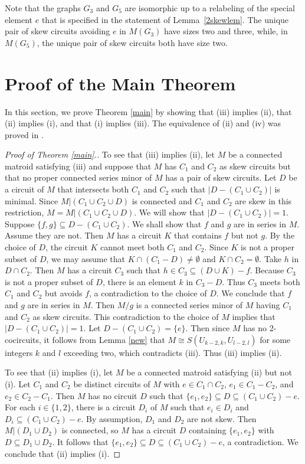 \documentclass[12pt,reqno]{amsart}
\theoremstyle{definition}
\theoremstyle{remark}
\numberwithin{equation}{section}
\begin{document}
Note that the graphs $G_3$ and $G_5$ are isomorphic up to a relabeling of the special element $e$ that is specified in the statement of Lemma~\ref{2skewlem}. The unique pair of skew circuits avoiding $e$ in $M(G_3)$ have sizes two and three, while, in $M(G_5)$, the unique pair of skew circuits both have size two. 

\section{Proof of the Main Theorem}
In this section, we prove Theorem \ref{main} by showing that (iii) implies (ii), that (ii) implies (i), and that (i) implies (iii).    
The equivalence of (ii) and (iv) was proved in \cite[Theorem 1.1]{ub}.

\begin{proof}[Proof of Theorem \ref{main}.]

To see that (iii) implies (ii), let $M$ be a connected matroid satisfying (iii) and suppose that $M$ has $C_1$ and $C_2$ as skew circuits but that no proper connected series minor of $M$ has a pair of skew circuits.  
Let $D$ be a circuit of $M$ that intersects both $C_1$ and $C_2$ such that $|D-(C_1\cup C_2)|$ is minimal. 
Since $M|(C_1\cup C_2\cup D)$ is connected and $C_1$ and $C_2$ are skew in this restriction, $M=M|(C_1\cup C_2\cup D)$.  
We will show that $|D-(C_1\cup C_2)|=1$. 
Suppose $\{f,g\}\subseteq D-(C_1\cup C_2)$. 
We shall show that $f$ and $g$ are in series in $M$. 
Assume they are not. 
Then $M$ has a circuit $K$ that contains $f$ but not $g$. By the choice of $D$, the circuit $K$ cannot meet both $C_1$ and $C_2$. 
Since $K$ is not a proper subset of $D$, we may assume that $K\cap (C_1-D)\neq \emptyset$ and $K\cap C_2=\emptyset$. 
Take $h$ in $D\cap C_2$.
Then $M$ has a circuit $C_3$ such that $h\in C_3\subseteq (D\cup K)-f$. 
Because $C_3$ is not a proper subset of $D$, there is an element $k$ in $C_3-D$. 
Thus $C_3$ meets both $C_1$ and $C_2$ but avoids $f$, a contradiction to the choice of $D$. 
We conclude that $f$ and $g$ are in series in $M$. 
Then $M/g$ is a connected series minor of $M$ having $C_1$ and $C_2$ as skew circuits. 
This contradiction to the choice of $M$ implies that $|D-(C_1\cup C_2)|=1$. 
Let $D-(C_1\cup C_2)=\{e\}$. 
Then since $M$ has no 2-cocircuits, it follows from Lemma \ref{new} that $M\cong S(U_{k-2,k},U_{l-2,l})$ for some integers $k$ and $l$ exceeding two, which contradicts (iii). 
Thus (iii) implies (ii). 

\qquad

To see that (ii) implies (i), let $M$ be a connected matroid satisfying (ii) but not (i). 
Let $C_1$ and $C_2$ be distinct circuits of $M$ with $e\in C_1\cap C_2$, $e_1 \in C_1-C_2$, and $e_2\in C_2-C_1$. 
Then $M$ has no circuit $D$ such that $\{e_1,e_2\}\subseteq D\subseteq (C_1\cup C_2)-e$. 
For each $i\in \{1,2\}$, there is a circuit $D_i$ of $M$ such that $e_i\in D_i$ and $D_i\subseteq (C_1\cup C_2)-e$. 
By assumption, $D_1$ and $D_2$ are not skew. 
Then $M|(D_1\cup D_2)$ is connected, so $M$ has a circuit $D$ containing $\{e_1,e_2\}$ with $D\subseteq D_1\cup D_2$.
It follows that $\{e_1,e_2\}\subseteq D\subseteq (C_1\cup C_2)-e$, a contradiction. 
We conclude that (ii) implies (i). 


\end{proof}
\end{document}
